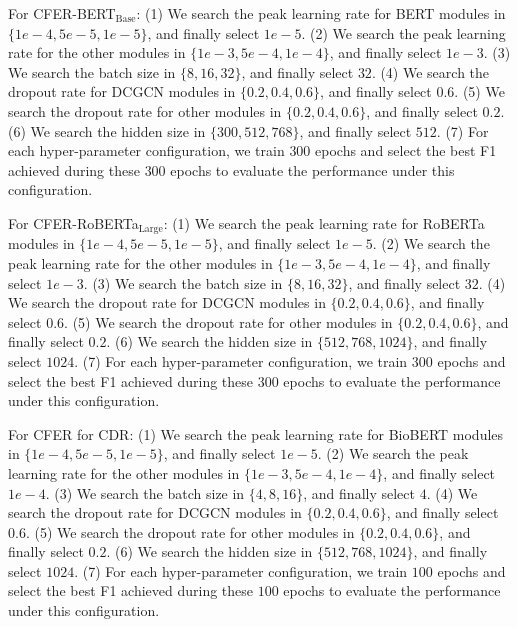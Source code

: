 \documentclass{article}
\begin{document}
For CFER-BERT$_{\text{Base}}$: 
(1) We search the peak learning rate for BERT modules in $\{1e-4, 5e-5, 1e-5\}$, and finally select $1e-5$.
(2) We search the peak learning rate for the other modules in $\{1e-3, 5e-4, 1e-4\}$, and finally select $1e-3$. 
(3) We search the batch size in $\{8, 16, 32\}$, and finally select $32$.
(4) We search the dropout rate for DCGCN modules in $\{0.2, 0.4, 0.6\}$, and finally select $0.6$.
(5) We search the dropout rate for other modules in $\{0.2, 0.4, 0.6\}$, and finally select $0.2$. 
(6) We search the hidden size in $\{300, 512, 768\}$, and finally select $512$. 
(7) For each hyper-parameter configuration, we train $300$ epochs and select the best F1 achieved during these $300$ epochs to evaluate the performance under this configuration. 

For CFER-RoBERTa$_{\text{Large}}$: 
(1) We search the peak learning rate for RoBERTa modules in $\{1e-4, 5e-5, 1e-5\}$, and finally select $1e-5$. 
(2) We search the peak learning rate for the other modules in $\{1e-3, 5e-4, 1e-4\}$, and finally select $1e-3$. 
(3) We search the batch size in $\{8, 16, 32\}$, and finally select $32$.
(4) We search the dropout rate for DCGCN modules in $\{0.2, 0.4, 0.6\}$, and finally select $0.6$.
(5) We search the dropout rate for other modules in $\{0.2, 0.4, 0.6\}$, and finally select $0.2$.
(6) We search the hidden size in $\{512, 768, 1024\}$, and finally select $1024$. 
(7) For each hyper-parameter configuration, we train $300$ epochs and select the best F1 achieved during these $300$ epochs to evaluate the performance under this configuration. 

For CFER for CDR: 
(1) We search the peak learning rate for BioBERT modules in $\{1e-4, 5e-5, 1e-5\}$, and finally select $1e-5$. 
(2) We search the peak learning rate for the other modules in $\{1e-3, 5e-4, 1e-4\}$, and finally select $1e-4$. 
(3) We search the batch size in $\{4, 8, 16\}$, and finally select $4$.
(4) We search the dropout rate for DCGCN modules in $\{0.2, 0.4, 0.6\}$, and finally select $0.6$.
(5) We search the dropout rate for other modules in $\{0.2, 0.4, 0.6\}$, and finally select $0.2$.
(6) We search the hidden size in $\{512, 768, 1024\}$, and finally select $1024$. 
(7) For each hyper-parameter configuration, we train $100$ epochs and select the best F1 achieved during these $100$ epochs to evaluate the performance under this configuration. 
\end{document}
